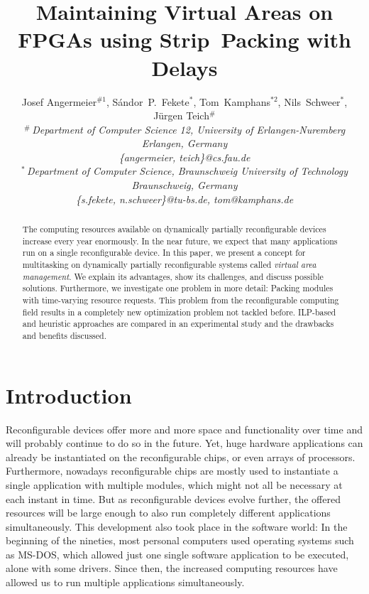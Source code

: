 \documentclass[10pt,journal]{IEEEtran}
\title{Maintaining Virtual Areas on FPGAs using Strip~Packing with Delays}
\author{{Josef Angermeier{\small $^{\#1}$},
S\'andor~P.~Fekete{\small $^{*}$},
Tom~Kamphans{\small $^{*2}$},
Nils~Schweer{\small $^{*}$},
J\"urgen Teich{\small $^{\#}$}}
\vspace{1.6mm}\\
\fontsize{10}{10}\selectfont\itshape
$^{\#}$\,Department of Computer Science 12, University of Erlangen-Nuremberg\\
Erlangen, Germany\\
\fontsize{9}{9}\selectfont\ttfamily\upshape
\{angermeier, teich\}@cs.fau.de\vspace{1.2mm}\\
\fontsize{10}{10}\selectfont\rmfamily\itshape
$^{*}$\,Department of Computer Science, Braunschweig University of Technology\\
Braunschweig, Germany\\
\fontsize{9}{9}\selectfont\ttfamily\upshape
\{s.fekete, n.schweer\}@tu-bs.de, tom@kamphans.de}
\begin{document}
\maketitle
\begin{abstract}
  The computing resources available on dynamically partially
  reconfigurable devices increase every year enormously. In the near
  future, we expect that many applications run on a single
  reconfigurable device. In this paper, we present a concept for
  multitasking on dynamically partially reconfigurable systems called
  {\em virtual area management}. We explain its advantages, show its
  challenges, and discuss possible solutions. Furthermore, we investigate
  one problem in more detail: Packing modules with time-varying 
  resource requests.
  This problem
  from the reconfigurable computing field results in a completely new
  optimization problem not tackled before. ILP-based and heuristic
  approaches are compared in an experimental study and the drawbacks
  and benefits discussed.

\end{abstract}



\section{Introduction}
Reconfigurable devices offer more and more space and functionality
over time and will probably continue to do so in the future. Yet, huge hardware
applications can already be instantiated on the reconfigurable chips,
or even arrays of processors. Furthermore, nowadays reconfigurable
chips are mostly used to instantiate a single application with
multiple modules, which might not all be necessary at each instant in
time. But as reconfigurable devices evolve further, the offered
resources will be large enough to also run completely different
applications simultaneously. This development also took place
in the software world: In the beginning of the nineties, most personal
computers used operating systems such as MS-DOS, 
which allowed just one single
software application to be executed, alone with some drivers. 
Since then, the increased computing resources have allowed us to run multiple
applications simultaneously.
\end{document}
